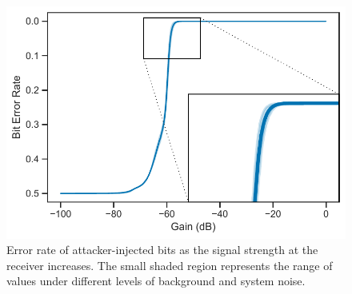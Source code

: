 \begin{table}
    \caption{Key values used in overshadowing simulations.}
    \label{tab:experimental-values}
\end{table}

\begin{figure}
    \centering
    \includegraphics[width=\columnwidth]{diagrams/overshadowing_ber_2.pdf}
    \caption{Error rate of attacker-injected bits as the signal strength at the receiver increases. The small shaded region represents the range of values under different levels of background and system noise.}
    \label{fig:overshadowing_ber}
\end{figure}

